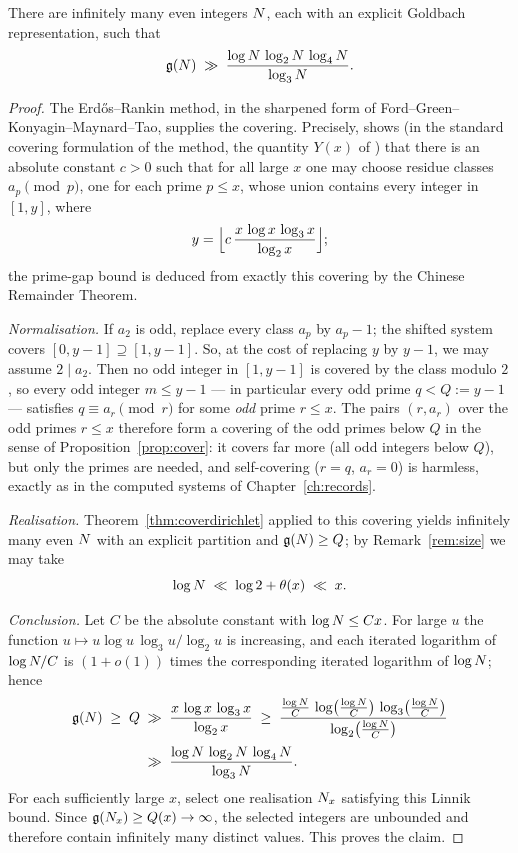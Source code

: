 \begin{theorem}\label{thm:lower}
There are infinitely many even integers $N$, each with an explicit
Goldbach representation, such that
\[
\mathfrak{g}(N)\;\gg\;\frac{\log N\,\log_2 N\,\log_4 N}{\log_3 N}.
\]
\end{theorem}

\begin{proof}
The Erd\H{o}s--Rankin method, in the sharpened form of
Ford--Green--Konyagin--Maynard--Tao, supplies the covering. Precisely,
\cite{FGKMT} shows (in the standard covering formulation of the method,
the quantity $Y(x)$ of \cite{FGKT,FGKMT}) that there is an absolute
constant $c>0$ such that for all large $x$ one may choose residue
classes $a_p\pmod p$, one for each prime $p\le x$, whose union contains
every integer in $[1,y]$, where
\[
y=\Bigl\lfloor c\,\frac{x\,\log x\,\log_3 x}{\log_2 x}\Bigr\rfloor;
\]
the prime-gap bound is deduced from exactly this covering by the Chinese
Remainder Theorem.

\emph{Normalisation.} If $a_2$ is odd, replace every class $a_p$ by
$a_p-1$; the shifted system covers $[0,y-1]\supseteq[1,y-1]$. So, at the
cost of replacing $y$ by $y-1$, we may assume $2\mid a_2$. Then no odd
integer in $[1,y-1]$ is covered by the class modulo $2$, so every odd
integer $m\le y-1$ --- in particular every odd prime $q<Q:=y-1$ ---
satisfies $q\equiv a_r\pmod r$ for some \emph{odd} prime $r\le x$. The
pairs $(r,a_r)$ over the odd primes $r\le x$ therefore form a covering
of the odd primes below $Q$ in the sense of
Proposition~\ref{prop:cover}: it covers far more (all odd integers below
$Q$), but only the primes are needed, and self-covering ($r=q$,
$a_r=0$) is harmless, exactly as in the computed systems of
Chapter~\ref{ch:records}.

\emph{Realisation.} Theorem~\ref{thm:coverdirichlet} applied to this
covering yields infinitely many even $N$ with an explicit partition and
$\mathfrak{g}(N)\ge Q$; by Remark~\ref{rem:size} we may take
\[
\log N\;\ll\;\log2+\theta(x)\;\ll\;x.
\]

\emph{Conclusion.} Let $C$ be the absolute constant with
$\log N\le Cx$. For large $u$ the function
$u\mapsto u\log u\,\log_3u/\log_2u$ is increasing, and each iterated
logarithm of $\log N/C$ is $(1+o(1))$ times the corresponding iterated
logarithm of $\log N$; hence
\begin{align*}
\mathfrak{g}(N)\;\ge\;Q\;&\gg\;\frac{x\,\log x\,\log_3x}{\log_2x}
\;\ge\;\frac{\tfrac{\log N}{C}\,\log\bigl(\tfrac{\log N}{C}\bigr)\,\log_3\bigl(\tfrac{\log N}{C}\bigr)}{\log_2\bigl(\tfrac{\log N}{C}\bigr)}\\[2pt]
&\gg\;\frac{\log N\,\log_2N\,\log_4N}{\log_3N}.
\end{align*}
For each sufficiently large $x$, select one realisation $N_x$
satisfying this Linnik bound. Since $\mathfrak{g}(N_x)\ge Q(x)\to\infty$, the
selected integers are unbounded and therefore contain infinitely many
distinct values. This proves the claim.
\end{proof}

